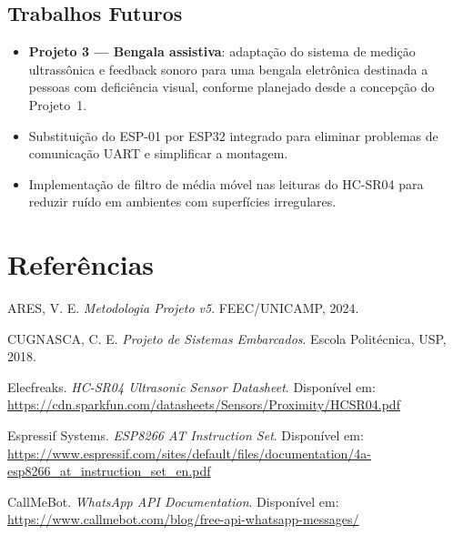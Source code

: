 \documentclass[12pt, a4paper]{article}
\begin{document}
\subsection{Trabalhos Futuros}

\begin{itemize}
  \item \textbf{Projeto 3 --- Bengala assistiva}: adaptação do sistema de medição ultrassônica e feedback sonoro para uma bengala eletrônica destinada a pessoas com deficiência visual, conforme planejado desde a concepção do Projeto~1.
  \item Substituição do ESP-01 por ESP32 integrado para eliminar problemas de comunicação UART e simplificar a montagem.
  \item Implementação de filtro de média móvel nas leituras do HC-SR04 para reduzir ruído em ambientes com superfícies irregulares.
\end{itemize}


\section*{Referências}

\begin{enumerate}[label={[\arabic*]}]
  \item ARES, V. E. \textit{Metodologia Projeto v5}. FEEC/UNICAMP, 2024.
  \item CUGNASCA, C. E. \textit{Projeto de Sistemas Embarcados}. Escola Politécnica, USP, 2018.
  \item Elecfreaks. \textit{HC-SR04 Ultrasonic Sensor Datasheet}. Disponível em: \url{https://cdn.sparkfun.com/datasheets/Sensors/Proximity/HCSR04.pdf}
  \item Espressif Systems. \textit{ESP8266 AT Instruction Set}. Disponível em: \url{https://www.espressif.com/sites/default/files/documentation/4a-esp8266_at_instruction_set_en.pdf}
  \item CallMeBot. \textit{WhatsApp API Documentation}. Disponível em: \url{https://www.callmebot.com/blog/free-api-whatsapp-messages/}
\end{enumerate}
\end{document}
